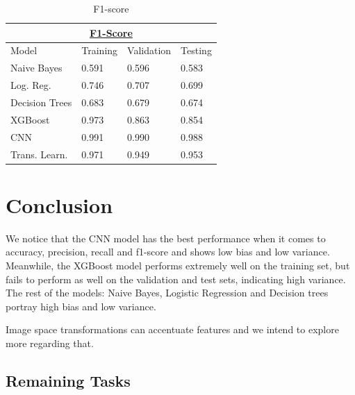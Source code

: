 \documentclass[10pt,twocolumn,letterpaper]{article}
\begin{document}
\begin{table}[]
   \begin{tabular}{|llll|}
   \hline
   \multicolumn{4}{|c|}{{\ul \textbf{F1-Score}}}                                                                    \\ \hline
   \multicolumn{1}{|l|}{Model}          & \multicolumn{1}{l|}{Training} & \multicolumn{1}{l|}{Validation} & Testing \\ \hline
   \multicolumn{1}{|l|}{Naive Bayes}    & \multicolumn{1}{l|}{0.591}    & \multicolumn{1}{l|}{0.596}      & 0.583   \\ \hline
   \multicolumn{1}{|l|}{Log. Reg.}      & \multicolumn{1}{l|}{0.746}    & \multicolumn{1}{l|}{0.707}      & 0.699   \\ \hline
   \multicolumn{1}{|l|}{Decision Trees} & \multicolumn{1}{l|}{0.683}    & \multicolumn{1}{l|}{0.679}      & 0.674   \\ \hline
   \multicolumn{1}{|l|}{XGBoost}        & \multicolumn{1}{l|}{0.973}    & \multicolumn{1}{l|}{0.863}      & 0.854   \\ \hline
   \multicolumn{1}{|l|}{CNN}            & \multicolumn{1}{l|}{0.991}    & \multicolumn{1}{l|}{0.990}      & 0.988   \\ \hline
   \multicolumn{1}{|l|}{Trans. Learn.}  & \multicolumn{1}{l|}{0.971}    & \multicolumn{1}{l|}{0.949}      & 0.953   \\ \hline
   \end{tabular}
   \caption{F1-score}
\end{table}

\section{Conclusion}

We notice that the CNN model has the best performance when it comes to accuracy, precision, recall and f1-score and shows low bias and low variance. Meanwhile, the XGBoost model performs extremely well on the training set, but fails to perform as well on the validation and test sets, indicating high variance. The rest of the models: Naive Bayes, Logistic Regression and Decision trees portray high bias and low variance. 

Image space transformations can accentuate features and we intend to explore more regarding that.


\subsection{Remaining Tasks}
\end{document}
